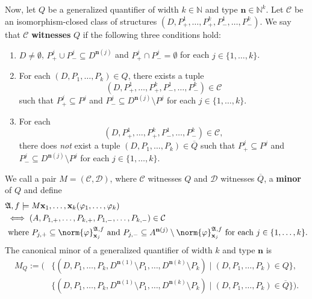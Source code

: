 \documentclass{article}
\theoremstyle{definition}
\begin{document}
Now, let $Q$ be a generalized quantifier of width $k\in\mathbb{N}$ and type $\textbf{n}\in \mathbb{N}^k$. Let $\mathcal{C}$ be an isomorphism-closed class of structures $(D,P_+^1,\dots,P_+^k,P_-^1,\dots,P^k_-)$. We say that $\mathcal{C}$ \textbf{witnesses} $Q$ if the following three conditions hold:
\begin{enumerate}
    \item $D\neq\emptyset$, $P_+^j\cup P_-^j\subseteq D^{\textbf{n}(j)}$ and $P_+^j\cap P_-^j=\emptyset$ for each $j\in\{1,\dots,k\}$.
    \item For each $(D,P_1,\dots,P_k)\in Q$, there exists a tuple
    \[
        (D,P_+^1,\dots,P_+^k,P_-^1,\dots,P^k_-)\in\mathcal{C}
    \]
    such that $P^j_+\subseteq P^j$ and $P^j_-\subseteq D^{\textbf{n}(j)}\setminus P^j$ for each $j\in\{1,\dots,k\}$.
    \item For each
    \[
        (D,P_+^1,\dots,P_+^k,P_-^1,\dots,P^k_-)\in\mathcal{C},
    \]
    there does \textit{not} exist a tuple $(D,P_1,\dots,P_k)\in \overline{Q}$ such that $P^j_+\subseteq P^j$ and $P^j_-\subseteq D^{\textbf{n}(j)}\setminus P^j$ for each $j\in\{1,\dots,k\}$.
\end{enumerate}
We call a pair $M=(\mathcal{C},\mathcal{D})$, where $\mathcal{C}$ witnesses $Q$ and $\mathcal{D}$ witnesses $\overline{Q}$, a \textbf{minor} of $Q$ and define
\begin{align*}
    &\mathfrak{A},f\models M \textbf{x}_1,\dots,\textbf{x}_k(\varphi_1,\dots,\varphi_k)\\
    &\iff (A,P_{1,+},\dots,P_{k,+},P_{1,-},\dots,P_{k,-})\in\mathcal{C}\\
    &\text{ where }P_{j,+}\subseteq \norm{\varphi}^{\mathfrak{A},f}_{\textbf{x}_j} \text{ and } P_{j,-}\subseteq A^{\textbf{n}(j)}\setminus \norm{\varphi}^{\mathfrak{A},f}_{\textbf{x}_j} \text{ for each } j\in\{1,\dots,k\}.
\end{align*}
The canonical minor of a generalized quantifier of width $k$ and type $\textbf{n}$ is
\begin{align*}
    M_Q:=(&\{(D,P_1,\dots,P_k,D^{\textbf{n}(1)}\setminus P_1,\dots,D^{\textbf{n}(k)}\setminus P_k)\mid (D,P_1,\dots,P_k)\in Q\},\\
    &\{(D,P_1,\dots,P_k,D^{\textbf{n}(1)}\setminus P_1,\dots,D^{\textbf{n}(k)}\setminus P_k)\mid (D,P_1,\dots,P_k)\in \overline{Q}\}).
\end{align*}
\end{document}
